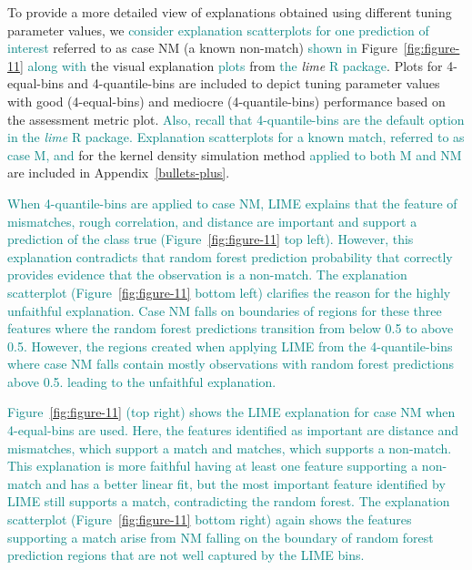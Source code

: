 \documentclass[AMS,STIX2COL]{WileyNJD-v2}\usepackage[]{graphicx}\usepackage[]{color}
\newcommand{\kge}[1]{\textcolor{teal}{#1}}
\renewcommand{\sout}[1]{\unskip}
\begin{document}
To provide a more detailed view of explanations obtained using different tuning parameter values, we \kge{consider explanation scatterplots for one prediction of interest} \sout{take a closer look at explanations for two observations of interest, which will be} referred to as case NM (a known non-match)\sout{ and case NM (a known non-match), using explanation scatterplots.} \kge{shown in} Figure~\ref{fig:figure-11} \sout{includes} \kge{along with} the visual \sout{representation plots of} explanation\sout{s} \kge{plots} \sout{(}from \kge{the} \emph{lime} \kge{R package}\sout{)\ and explanation scatterplots for cases M and NM}. Plots for 4-equal-bins and 4-quantile-bins are included to depict tuning parameter values with good (4-equal-bins) and mediocre (4-quantile-bins) performance based on the assessment metric plot. \kge{Also, recall that 4-quantile-bins are the default option in the \emph{lime} R package.} \sout{Plots} \kge{Explanation scatterplots for a known match, referred to as case M, and} for the kernel density simulation method \kge{applied to both M and NM} are included in Appendix~\ref{bullets-plus}\sout{ (Figure \ref{fig:figure-F5})}. 

\kge{When 4-quantile-bins are applied to case NM, LIME explains that the feature of mismatches, rough correlation, and distance are important and support a prediction of the class true (Figure~\ref{fig:figure-11} top left). However, this explanation contradicts that random forest prediction probability that correctly provides evidence that the observation is a non-match. The explanation scatterplot (Figure~\ref{fig:figure-11} bottom left) clarifies the reason for the highly unfaithful explanation. Case NM falls on boundaries of regions for these three features where the random forest predictions transition from below 0.5 to above 0.5. However, the regions created when applying LIME from the 4-quantile-bins where case NM falls contain mostly observations with random forest predictions above 0.5. leading to the unfaithful explanation.}

\kge{Figure~\ref{fig:figure-11} (top right) shows the LIME explanation for case NM when 4-equal-bins are used. Here, the features identified as important are distance and mismatches, which support a match and matches, which supports a non-match. This explanation is more faithful having at least one feature supporting a non-match and has a better linear fit, but the most important feature identified by LIME still supports a match, contradicting the random forest. The explanation scatterplot (Figure~\ref{fig:figure-11} bottom right) again shows the features supporting a match arise from NM falling on the boundary of random forest prediction regions that are not well captured by the LIME bins.}
\end{document}

